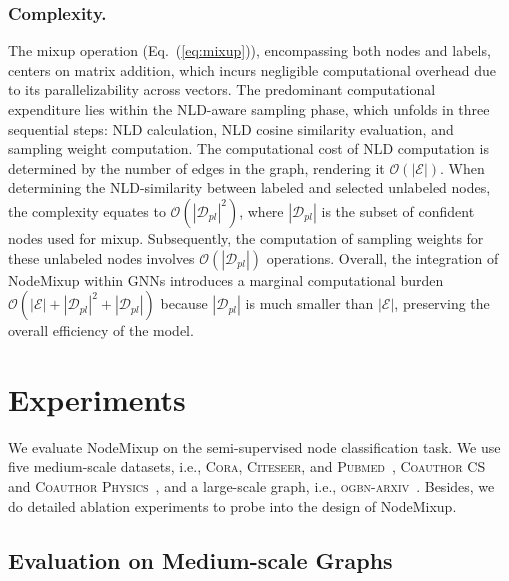 \documentclass[letterpaper]{article} %
\begin{document}
\subsubsection{Complexity.}
The mixup operation (Eq.~(\ref{eq:mixup})), encompassing both nodes and labels, centers on matrix addition, which incurs negligible computational overhead due to its parallelizability across vectors. The predominant computational expenditure lies within the NLD-aware sampling phase, which unfolds in three sequential steps: NLD calculation, NLD cosine similarity evaluation, and sampling weight computation. The computational cost of NLD computation is determined by the number of edges in the graph, rendering it $\mathcal{O}(|\mathcal{E}|)$. When determining the NLD-similarity between labeled and selected unlabeled nodes, the complexity equates to $\mathcal{O}(|\mathcal{D}_{pl}|^{2})$, where $|\mathcal{D}_{pl}|$ is the subset of confident nodes used for mixup. Subsequently, the computation of sampling weights for these unlabeled nodes involves $\mathcal{O}(|\mathcal{D}_{pl}|)$ operations. Overall, the integration of NodeMixup within GNNs introduces a marginal computational burden $\mathcal{O}(|\mathcal{E}| + |\mathcal{D}_{pl}|^{2} + |\mathcal{D}_{pl}|)$ because $|\mathcal{D}_{pl}|$ is much smaller than $|\mathcal{E}|$, preserving the overall efficiency of the model.

\section{Experiments}
We evaluate NodeMixup on the semi-supervised node classification task. We  use five medium-scale datasets, i.e., \textsc{Cora}, \textsc{Citeseer}, and \textsc{Pubmed}~\cite{cora}, \textsc{Coauthor CS} and \textsc{Coauthor Physics}~\cite{coauthor}, and a large-scale graph, i.e., \textsc{ogbn-arxiv}~\cite{ogb}. Besides, we do detailed ablation experiments to probe into the design of NodeMixup. 

\subsection{Evaluation on Medium-scale Graphs}
\end{document}
